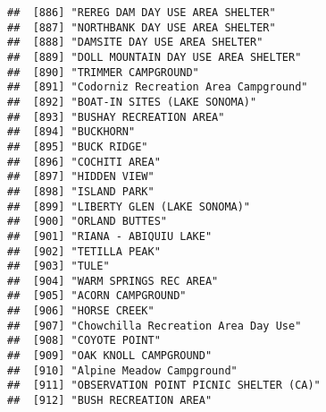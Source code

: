 \documentclass[
]{article}
\begin{document}
\begin{verbatim}
##  [886] "REREG DAM DAY USE AREA SHELTER"                                                      
##  [887] "NORTHBANK DAY USE AREA SHELTER"                                                      
##  [888] "DAMSITE DAY USE AREA SHELTER"                                                        
##  [889] "DOLL MOUNTAIN DAY USE AREA SHELTER"                                                  
##  [890] "TRIMMER CAMPGROUND"                                                                  
##  [891] "Codorniz Recreation Area Campground"                                                 
##  [892] "BOAT-IN SITES (LAKE SONOMA)"                                                         
##  [893] "BUSHAY RECREATION AREA"                                                              
##  [894] "BUCKHORN"                                                                            
##  [895] "BUCK RIDGE"                                                                          
##  [896] "COCHITI AREA"                                                                        
##  [897] "HIDDEN VIEW"                                                                         
##  [898] "ISLAND PARK"                                                                         
##  [899] "LIBERTY GLEN (LAKE SONOMA)"                                                          
##  [900] "ORLAND BUTTES"                                                                       
##  [901] "RIANA - ABIQUIU LAKE"                                                                
##  [902] "TETILLA PEAK"                                                                        
##  [903] "TULE"                                                                                
##  [904] "WARM SPRINGS REC AREA"                                                               
##  [905] "ACORN CAMPGROUND"                                                                    
##  [906] "HORSE CREEK"                                                                         
##  [907] "Chowchilla Recreation Area Day Use"                                                  
##  [908] "COYOTE POINT"                                                                        
##  [909] "OAK KNOLL CAMPGROUND"                                                                
##  [910] "Alpine Meadow Campground"                                                            
##  [911] "OBSERVATION POINT PICNIC SHELTER (CA)"                                               
##  [912] "BUSH RECREATION AREA"                                                                

\end{verbatim}
\end{document}
